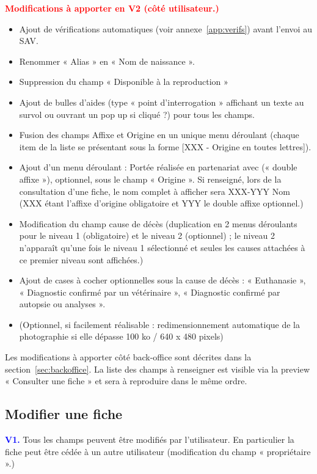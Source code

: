 \documentclass[a4paper,10pt]{article}
\newcommand\existant[1]{\noindent\textbf{\textcolor{blue}{#1}}}
\newcommand\desire[1]{\noindent\textbf{\textcolor{red}{#1}}}
\begin{document}
\noindent\desire{Modifications à apporter en V2 (côté utilisateur.)}
\begin{itemize}
\item Ajout de vérifications automatiques (voir annexe~\ref{app:verifs}) avant l'envoi au SAV.
\item Renommer « Alias » en « Nom de naissance ».
\item Suppression du champ « Disponible à la reproduction »
\item Ajout de bulles d'aides (type « point d'interrogation » affichant un texte au survol ou ouvrant un pop up si cliqué ?) pour tous les champs.
\item Fusion des champs Affixe et Origine en un unique menu déroulant (chaque item de la liste se présentant sous la forme [XXX - Origine en toutes lettres]).
\item Ajout d'un menu déroulant : Portée réalisée en partenariat avec (« double affixe »), optionnel, sous le champ « Origine ». Si renseigné, lors de la consultation d'une fiche, le nom complet à afficher sera XXX-YYY Nom (XXX étant l'affixe d'origine obligatoire et YYY le double affixe optionnel.)
\item Modification du champ cause de décès (duplication en 2 menus déroulants pour le niveau 1 (obligatoire) et le niveau 2 (optionnel) ; le niveau 2 n'apparaît qu'une fois le niveau 1 sélectionné et seules les causes attachées à ce premier niveau sont affichées.)
\item Ajout de cases à cocher optionnelles sous la cause de décès : « Euthanasie », « Diagnostic confirmé par un vétérinaire », « Diagnostic confirmé par autopsie ou analyses ».       
\item (Optionnel, si facilement réalisable : redimensionnement automatique de la photographie si elle dépasse 100 ko / 640 x 480 pixels)
\end{itemize}

Les modifications à apporter côté back-office sont décrites dans la section~\ref{sec:backoffice}. La liste des champs à renseigner est visible via la preview « Consulter une fiche » et sera à reproduire dans le même ordre.  

\subsection{Modifier une fiche}

\existant{V1.} Tous les champs peuvent être modifiés par l'utilisateur. En particulier la fiche peut être cédée à un autre utilisateur (modification du champ « propriétaire ».)  
\end{document}
